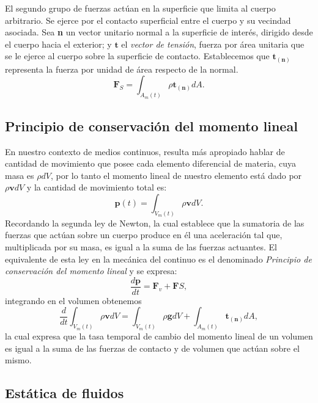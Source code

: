 \documentclass[a4paper,10pt, oneside]{book}
\begin{document}
El segundo grupo de fuerzas actúan en la superficie que limita al cuerpo arbitrario. Se ejerce por el contacto superficial entre el cuerpo y su vecindad asociada. Sea \textbf{n} un vector unitario normal a la superficie de interés, dirigido desde el cuerpo hacia el exterior; y $\mathbf{t}$ el \textit{vector de tensión}, fuerza por área unitaria que se le ejerce al cuerpo sobre la superficie de contacto. Establecemos que $\mathbf{t_{(n)}}$ representa la fuerza por unidad de área respecto de la normal.
\begin{equation}
	\mathbf{F}_S = \int_{A_m(t)} \rho \mathbf{t_{(n)}} dA. \nonumber
\end{equation}

\subsection{Principio de conservación del momento lineal}

En nuestro contexto de medios continuos, resulta más apropiado hablar de cantidad de movimiento que posee cada elemento diferencial de materia, cuya masa es $\rho dV$, por lo tanto el momento lineal de nuestro elemento está dado por $\rho \mathbf{v} dV$ y la cantidad de movimiento total es:
\begin{equation}
	\mathbf{p}(t) = \int_{V_m(t)} \rho \mathbf{v}dV. \nonumber
\end{equation}
Recordando la segunda ley de Newton, la cual establece que la sumatoria de las fuerzas que actúan sobre un cuerpo produce en él una aceleración tal que, multiplicada por su masa, es igual a la suma de las fuerzas actuantes. El equivalente de esta ley en la mecánica del continuo es el denominado \textit{Principio de conservación del momento lineal} y se expresa:
\begin{equation}
	\frac{d \mathbf{p}}{dt} = \mathbf{F}_v + \mathbf{F}S, \nonumber
\end{equation}
integrando en el volumen obtenemos
\begin{equation}
	\frac{d}{dt}	\int_{V_m(t)} \rho \mathbf{v} dV = \int_{V_m(t)} \rho \mathbf{g} dV + \int_{A_m(t)} \mathbf{t_{(n)}} dA,
	\label{eq:2-1}
\end{equation}
la cual expresa que la tasa temporal de cambio del momento lineal de un volumen es igual a la suma de las fuerzas de contacto y de volumen que actúan sobre el mismo.

\subsection{Estática de fluidos}
\end{document}
